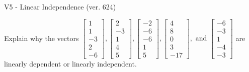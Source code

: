 \begin{exercise}
  \begin{exerciseTitle}V5 - Linear Independence (ver. 624)\end{exerciseTitle}
  \begin{exerciseStatement}
    Explain why the vectors \(\left[\begin{array}{r}
1 \\
1 \\
-3 \\
2 \\
-6
\end{array}\right] , \left[\begin{array}{r}
2 \\
-3 \\
1 \\
4 \\
5
\end{array}\right] , \left[\begin{array}{r}
-2 \\
-6 \\
-6 \\
1 \\
5
\end{array}\right] , \left[\begin{array}{r}
4 \\
8 \\
0 \\
3 \\
-17
\end{array}\right] , \text{ and } \left[\begin{array}{r}
-6 \\
-3 \\
1 \\
-4 \\
-3
\end{array}\right]\) are linearly dependent or linearly independent.	



\end{exerciseStatement}
\end{exercise}
